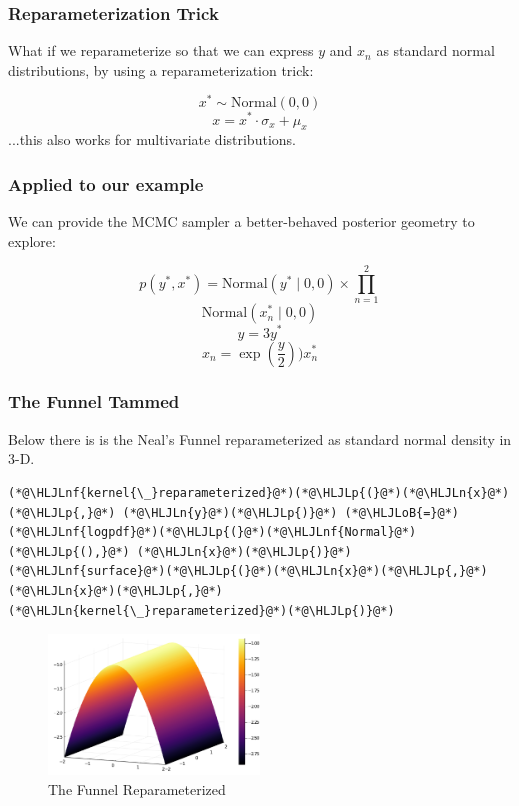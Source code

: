 \documentclass{beamer}
\newcommand{\HLJLn}[1]{#1}
\newcommand{\HLJLnf}[1]{\textcolor[RGB]{66,102,213}{#1}}
\newcommand{\HLJLoB}[1]{\textcolor[RGB]{102,102,102}{\textbf{#1}}}
\newcommand{\HLJLp}[1]{#1}
\begin{document}
\begin{frame}[fragile]
\frametitle{Reparameterization Trick}

What if we reparameterize so that we can express $y$ and $x_n$ as standard normal distributions, by using a reparameterization trick\footnotemark[2]:

\[
x^* \sim \text{Normal}(0, 0)
\]
\[
x = x^* \cdot \sigma_x + \mu_x
\]
...this also works for multivariate distributions.



\end{frame}


\begin{frame}[fragile]
\frametitle{Applied to our example}

We can provide the MCMC sampler a better-behaved posterior geometry to explore:

\[
p(y^*,x^*) = \text{Normal}(y^* \mid 0,0) \times \prod_{n=1}^2
\]
\[
\text{Normal}(x^*_n \mid 0,0)
\]
\[
y = 3y^*
\]
\[
x_n = \exp \left( \frac{y}{2} \right) ) x^*_n
\]


\end{frame}


\begin{frame}[fragile]
\frametitle{The Funnel Tammed}

Below there is is the Neal's Funnel reparameterized as standard normal density in 3-D.


\begin{lstlisting}
(*@\HLJLnf{kernel{\_}reparameterized}@*)(*@\HLJLp{(}@*)(*@\HLJLn{x}@*)(*@\HLJLp{,}@*) (*@\HLJLn{y}@*)(*@\HLJLp{)}@*) (*@\HLJLoB{=}@*) (*@\HLJLnf{logpdf}@*)(*@\HLJLp{(}@*)(*@\HLJLnf{Normal}@*)(*@\HLJLp{(),}@*) (*@\HLJLn{x}@*)(*@\HLJLp{)}@*)
(*@\HLJLnf{surface}@*)(*@\HLJLp{(}@*)(*@\HLJLn{x}@*)(*@\HLJLp{,}@*) (*@\HLJLn{x}@*)(*@\HLJLp{,}@*)  (*@\HLJLn{kernel{\_}reparameterized}@*)(*@\HLJLp{)}@*)
\end{lstlisting}

\begin{figure}[!h]
\center
\includegraphics[width=0.5\textwidth]{images_slides/Neals_funnel_slides_funneldensityrepar_1.pdf}
\caption{The Funnel Reparameterized}
\label{fig:funneldensityrepar}
\end{figure}



\end{frame}
\end{document}
